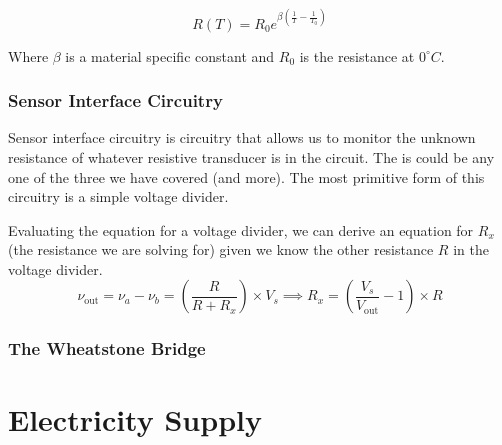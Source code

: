 \documentclass[12pt]{article}
\begin{document}
\begin{equation*}
  R(T) = R_0 e^{\beta (\frac{1}{T}-\frac{1}{T_0})}
\end{equation*}

Where $\beta$ is a material specific constant and $R_0$ is the resistance at $0^\circ C$.

\subsubsection{Sensor Interface Circuitry}
Sensor interface circuitry is circuitry that allows us to monitor the unknown resistance of whatever resistive transducer is in the circuit.
The is could be any one of the three we have covered (and more).
The most primitive form of this circuitry is a simple voltage divider.

Evaluating the equation for a voltage divider, we can derive an equation for $R_x$ (the resistance we are solving for) given we know the other resistance $R$ in the voltage divider.
\begin{equation*}
  \nu_{\text{out}} = \nu_a - \nu_b = (\frac{R}{R+ R_x}) \times V_s \implies R_x = (\frac{V_s}{V_\text{out}}-1)\times R
\end{equation*}

\subsubsection{The Wheatstone Bridge}

\section{Electricity Supply}
\end{document}
